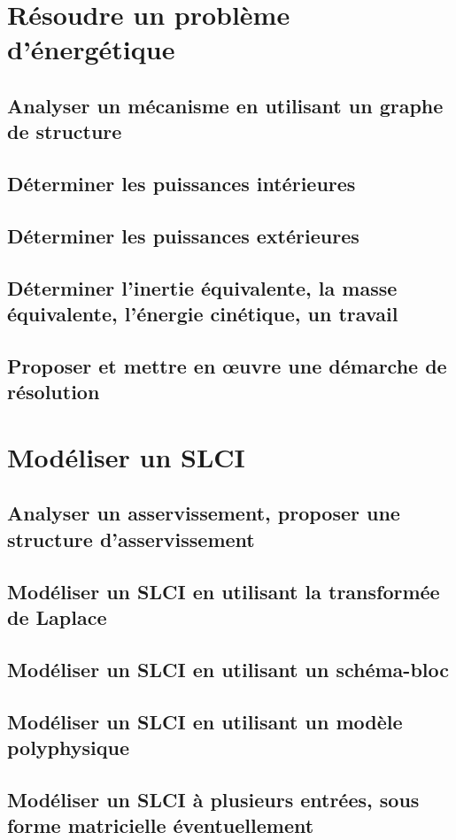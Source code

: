 \chapter{Résoudre un problème d'énergétique} 
\section{Analyser un mécanisme en utilisant un graphe de structure} 
\section{Déterminer les puissances intérieures} 
\section{Déterminer les puissances extérieures} 
\section{Déterminer l'inertie équivalente, la masse équivalente, l'énergie cinétique, un travail} 
\section{Proposer et mettre en œuvre une démarche de résolution} 
\setchapterpreamble[u]{\margintoc} 
\chapter{Modéliser un SLCI} 
\section{Analyser un asservissement, proposer une structure d'asservissement} 
\section{Modéliser un SLCI en utilisant la transformée de Laplace} 
\section{Modéliser un SLCI en utilisant un schéma-bloc} 
\section{Modéliser un SLCI en utilisant un modèle polyphysique} 
\section{Modéliser un SLCI à plusieurs entrées, sous forme matricielle éventuellement} 

